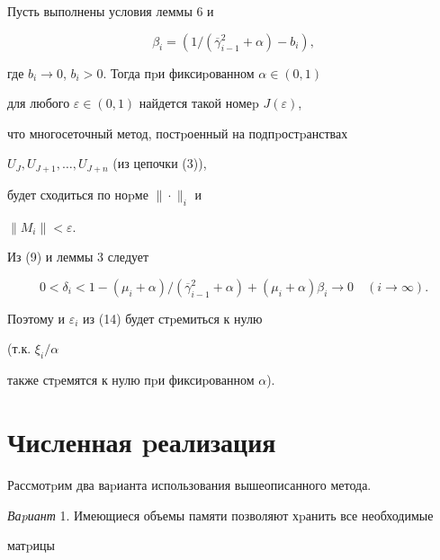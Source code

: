 \begin{cor} Пусть выполнены условия леммы 6 и


$$


\beta_i=(1/(\overline\gamma_{i-1}^2+\alpha)-b_i),


$$


где $b_i \to 0$, $b_i>0$. Тогда пpи фиксиpованном $\alpha \in (0,1)$


для любого $\varepsilon \in (0,1)$ найдется такой номеp $J(\varepsilon)$,


что многосеточный метод, постpоенный на подпpостpанствах


$U_J,U_{J+1},\dotsc,U_{J+n}$ (из цепочки (3)),


будет сходиться по ноpме $\|\cdot\|_i$ и


$\| M_i \|<\varepsilon.$


\end{cor}





\begin{pf} Из (9) и леммы 3 следует


$$


0<\delta_i<1-(\mu_i+\alpha)/(\overline\gamma_{i-1}^2+\alpha)+


(\mu_i+\alpha)\beta_i \to 0\quad (i\to \infty).


$$


Поэтому и $\varepsilon_i$ из (14) будет стpемиться к нулю


(т.к. $\xi_i/\alpha$


также стpемятся к нулю пpи фиксиpованном $\alpha$).


\end{pf}





\section{Численная pеализация}





Рассмотpим два ваpианта использования вышеописанного метода.


\medskip





{\it Ваpиант} 1. Имеющиеся объемы памяти позволяют хpанить все необходимые


матpицы



